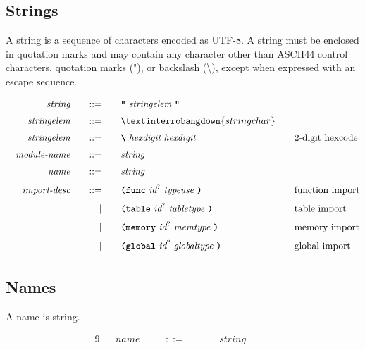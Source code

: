 \subsection{Strings}
A string is a sequence of characters encoded as UTF-8. A string must be enclosed in quotation marks and may contain any character other than ASCII44 control characters, quotation marks ("), or backslash (\textbackslash), except when expressed with an escape sequence.

\begin{alignat*}{9}
    && \textit{string}    &&\quad ::= &\quad && \textbf{\texttt{"}}\ \textit{stringelem}\ \textbf{\texttt{"}}\  \quad && \\[1mm]
    && \textit{stringelem}    &&\quad ::= &\quad && \textinterrobangdown{stringchar}  \quad && \\[1mm]
    && \textit{stringelem}    &&\quad ::= &\quad && \textbf{\texttt{\textbackslash}}\ \textit{hexdigit}\ \textit{hexdigit}\  \quad && \textrm{2-digit hexcode} \\[1mm]
    && \textit{module-name}    &&\quad ::= &\quad && \textit{string} &&\\[1mm]
    && \textit{name}    &&\quad ::= &\quad && \textit{string} &&\\[1mm]
    && \textit{import-desc}       &&\quad ::= &\quad && \textbf{\texttt{(func}}\ \textit{id}^?\ \textit{typeuse}\ \textbf{\texttt{)}}  \quad && \textrm{function import} \\[1mm]
    &&                            &&\quad  |  &\quad && \textbf{\texttt{(table}}\ \textit{id}^?\ \textit{tabletype}\ \textbf{\texttt{)}}  \quad && \textrm{table import} \\[1mm]
    &&                            &&\quad  |  &\quad && \textbf{\texttt{(memory}}\ \textit{id}^?\ \textit{memtype}\ \textbf{\texttt{)}}  \quad && \textrm{memory import} \\[1mm]
    &&                            &&\quad  |  &\quad && \textbf{\texttt{(global}}\ \textit{id}^?\ \textit{globaltype}\ \textbf{\texttt{)}}  \quad && \textrm{global import} \\[1mm]
\end{alignat*}

\subsection{Names}
A name is string.

\begin{alignat*}{9}
    && \textit{name}    &&\quad ::= &\quad && \textit{string}  \quad && \\[1mm]
\end{alignat*}

